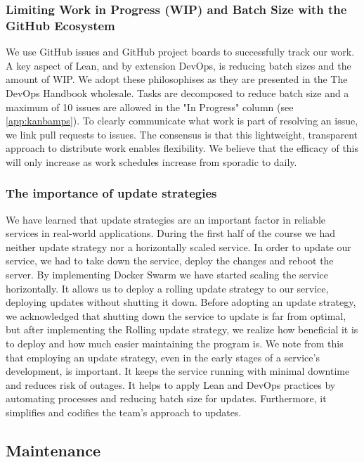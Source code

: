 \subsubsection{Limiting Work in Progress (WIP) and Batch Size with the GitHub Ecosystem}

We use GitHub issues and GitHub project boards to successfully track our work.
A key aspect of Lean, and by extension DevOps, is reducing batch sizes and the amount of WIP.
We adopt these philosophises as they are presented in the The DevOps Handbook \cite{devopshandbook} wholesale.
Tasks are decomposed to reduce batch size and a maximum of 10 issues are allowed in the "In Progress" column (see \autoref{app:kanbamps}).
To clearly communicate what work is part of resolving an issue, we link pull requests to issues.
The consensus is that this lightweight, transparent approach to distribute work enables flexibility.
We believe that the efficacy of this will only increase as work schedules increase from sporadic to daily.


\subsubsection{The importance of update strategies}
We have learned that update strategies are an important factor in reliable services in real-world applications. During the first half of the course we had neither update strategy nor a horizontally scaled service. In order to update our service, we had to take down the service, deploy the changes and reboot the server. By implementing Docker Swarm we have started scaling the service horizontally. It allows us to deploy a rolling update strategy to our service, deploying updates without shutting it down. Before adopting an update strategy, we acknowledged that shutting down the service to update is far from optimal, but after implementing the Rolling update strategy, we realize how beneficial it is to deploy and how much easier maintaining the program is.
We note from this that employing an update strategy, even in the early stages of a service's development, is important. It keeps the service running with minimal downtime and reduces risk of outages. It helps to apply Lean and DevOps practices by automating processes and reducing batch size for updates. Furthermore, it simplifies and codifies the team's approach to updates.

\subsection{Maintenance}

